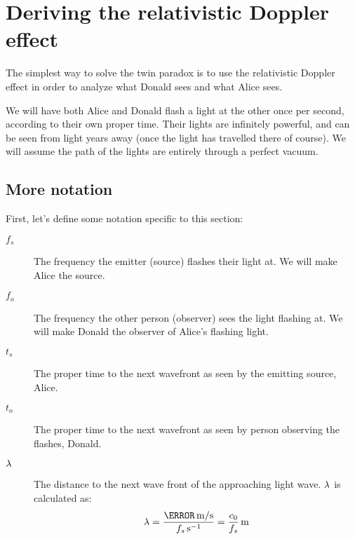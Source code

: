 \section{Deriving the relativistic Doppler effect}
	The simplest way to solve the twin paradox is to use the relativistic Doppler effect in order to analyze what Donald sees and what Alice sees.

	We will have both Alice and Donald flash a light at the other once per second, according to their own proper time.
	Their lights are infinitely powerful, and can be seen from light years away (once the light has travelled there of course).
	We will assume the path of the lights are entirely through a perfect vacuum.
	\subsection{More notation}
		First, let's define some notation specific to this section:
		\begin{description}
			\item[$f_s$] The frequency the emitter (source) flashes their light at. We will make Alice the source.
			\item[$f_o$] The frequency the other person (observer) sees the light flashing at. We will make Donald the observer of Alice's flashing light.
			\item[$t_s$] The proper time to the next wavefront as seen by the emitting source, Alice.
			\item[$t_o$] The proper time to the next wavefront as seen by person observing the flashes, Donald.
			\item[$\mathrm{\lambda}$] The distance to the next wave front of the approaching light wave. $\mathrm{\lambda}$ is calculated as:
			              \[\lam = \frac{\varSI{\clight}{\metre/\second}}{\varSI{f_s}{\per\second}} = \varSI{\frac{\si{\clight}}{f_s}}{\metre}\]
		\end{description}
